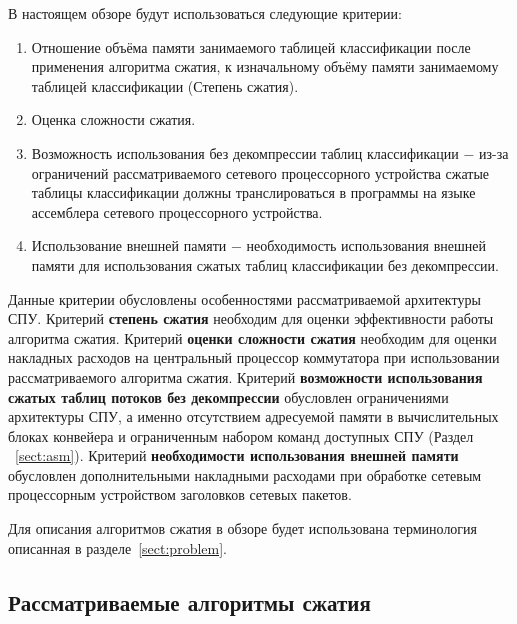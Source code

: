 \documentclass[oneside,final,12pt]{extarticle}
\begin{document}
        В настоящем обзоре будут использоваться следующие критерии:
        \begin{enumerate}
            \item Отношение объёма памяти занимаемого таблицей классификации после применения алгоритма сжатия, 
                к изначальному объёму памяти занимаемому таблицей классификации (Степень сжатия).
            \item Оценка сложности сжатия.
            \item Возможность использования без декомпрессии таблиц классификации $-$ 
                из-за ограничений рассматриваемого сетевого процессорного устройства сжатые таблицы классификации 
                должны транслироваться в программы на языке ассемблера сетевого процессорного устройства.
            \item Использование внешней памяти $-$ необходимость использования внешней памяти 
                для использования сжатых таблиц классификации без декомпрессии.
        \end{enumerate}

        Данные критерии обусловлены особенностями рассматриваемой архитектуры СПУ. 
        Критерий \textbf{степень сжатия} необходим для оценки эффективности работы алгоритма сжатия.
        Критерий \textbf{оценки сложности сжатия} необходим для оценки накладных расходов на центральный процессор коммутатора при использовании рассматриваемого
        алгоритма сжатия.
        Критерий \textbf{возможности использования сжатых таблиц потоков без декомпрессии} обусловлен ограничениями архитектуры СПУ, а именно
        отсутствием адресуемой памяти в вычислительных блоках конвейера и ограниченным набором команд доступных СПУ (Раздел ~\ref{sect:asm}).
        Критерий \textbf{необходимости использования внешней памяти} обусловлен дополнительными накладными расходами при обработке сетевым процессорным устройством 
        заголовков сетевых пакетов.

        Для описания алгоритмов сжатия в обзоре будет использована терминология описанная в разделе~\ref{sect:problem}. 

    \subsection{Рассматриваемые алгоритмы сжатия}
\end{document}
